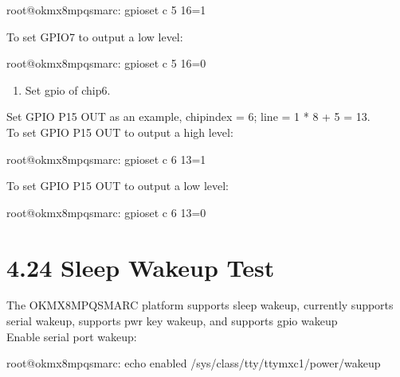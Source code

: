 \documentclass[letterpaper,10pt,openany,english]{sphinxmanual}
\begin{document}
\begin{sphinxVerbatim}[commandchars=\\\{\}]
root@ok\PYGZhy{}mx8mpq\PYGZhy{}smarc:\PYGZti{}\PYGZsh{} gpioset \PYGZhy{}c 5 16=1
\end{sphinxVerbatim}

\sphinxAtStartPar
To set GPIO7 to output a low level:

\begin{sphinxVerbatim}[commandchars=\\\{\}]
root@ok\PYGZhy{}mx8mpq\PYGZhy{}smarc:\PYGZti{}\PYGZsh{} gpioset \PYGZhy{}c 5 16=0
\end{sphinxVerbatim}
\begin{enumerate}
%
\setcounter{enumi}{1}
\item {} 
\sphinxAtStartPar
Set gpio of chip6.

\end{enumerate}

\sphinxAtStartPar
Set GPIO P15 OUT as an example, chipindex = 6; line = 1 * 8 + 5 = 13.\\
To set GPIO P15 OUT to output a high level:

\begin{sphinxVerbatim}[commandchars=\\\{\}]
root@ok\PYGZhy{}mx8mpq\PYGZhy{}smarc:\PYGZti{}\PYGZsh{} gpioset \PYGZhy{}c 6 13=1
\end{sphinxVerbatim}

\sphinxAtStartPar
To set GPIO P15 OUT to output a low level:

\begin{sphinxVerbatim}[commandchars=\\\{\}]
root@ok\PYGZhy{}mx8mpq\PYGZhy{}smarc:\PYGZti{}\PYGZsh{} gpioset \PYGZhy{}c 6 13=0
\end{sphinxVerbatim}


\section{4.24 Sleep Wake\sphinxhyphen{}up Test}
\label{\detokenize{linux-manual:sleep-wake-up-test}}
\sphinxAtStartPar
The OK\sphinxhyphen{}MX8MPQ\sphinxhyphen{}SMARC platform supports sleep wake\sphinxhyphen{}up, currently supports serial wake\sphinxhyphen{}up, supports pwr key wake\sphinxhyphen{}up, and supports gpio wake\sphinxhyphen{}up\\
Enable serial port wake\sphinxhyphen{}up:

\begin{sphinxVerbatim}[commandchars=\\\{\}]
root@ok\PYGZhy{}mx8mpq\PYGZhy{}smarc:\PYGZti{}\PYGZsh{} echo enabled \PYGZgt{} /sys/class/tty/ttymxc1/power/wakeup
\end{sphinxVerbatim}
\end{document}
